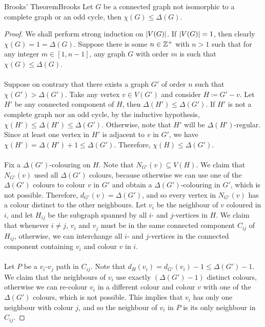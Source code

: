 \documentclass[math]{amznotes}
\theoremstyle{remark}
\newcommand{\0}{\mathbf{0}}
\newcommand{\1}{\mathbf{1}}
\begin{document}
\begin{thmbox}{Brooks' Theorem}{Brooks}
    Let $G$ be a connected graph not isomorphic to a complete graph or an odd cycle, then $\chi(G) \leq \Delta(G)$.
    \tcblower
    \begin{proof}
        We shall perform strong induction on ${\left\lvert {V(G)} \right\rvert}$. If ${\left\lvert {V(G)} \right\rvert} = 1$, then clearly $\chi(G) = 1 = \Delta(G)$. Suppose there is some $n \in \mathbb{Z}^+$ with $n > 1$ such that for any integer $m \in [1, n - 1]$, any graph $G$ with order $m$ is such that $\chi(G) \leq \Delta(G)$.
        \\\\
        Suppose on contrary that there exists a graph $G'$ of order $n$ such that $\chi(G') > \Delta(G')$. Take any vertex $v \in V(G')$ and consider $H \coloneqq G' - v$. Let $H'$ be any connected component of $H$, then $\Delta(H') \leq \Delta(G')$. If $H'$ is not a complete graph nor an odd cycle, by the inductive hypothesis, $\chi(H') \leq \Delta(H') \leq \Delta(G')$. Otherwise, note that $H'$ will be $\Delta(H')$-regular. Since at least one vertex in $H'$ is adjacent to $v$ in $G'$, we have $\chi(H') = \Delta(H') + 1 \leq \Delta(G')$. Therefore, $\chi(H) \leq \Delta(G')$.
        \\\\
        Fix a $\Delta(G')$-colouring on $H$. Note that $N_{G'}(v) \subseteq V(H)$. We claim that $N_{G'}(v)$ used all $\Delta(G')$ colours, because otherwise we can use one of the $\Delta(G')$ colours to colour $v$ in $G'$ and obtain a $\Delta(G')$-colouring in $G'$, which is not possible. Therefore, $d_{G'}(v) = \Delta(G')$, and so every vertex in $N_{G'}(v)$ has a colour distinct to the other neighbours. Let $v_i$ be the neighbour of $v$ coloured in $i$, and let $H_{ij}$ be the subgraph spanned by all $i$- and $j$-vertices in $H$. We claim that whenever $i \neq j$, $v_i$ and $v_j$ must be in the same connected component $C_{ij}$ of $H_{ij}$, otherwise, we can interchange all $i$- and $j$-vertices in the connected component containing $v_i$ and colour $v$ in $i$.
        \\\\
        Let $P$ be a $v_i$-$v_j$ path in $C_{ij}$. Note that $d_H(v_i) = d_{G'}(v_i) - 1 \leq \Delta(G') - 1$. We claim that the neighbours of $v_i$ use exactly $(\Delta(G') - 1)$ distinct colours, otherwise we can re-colour $v_i$ in a different colour and colour $v$ with one of the $\Delta(G')$ colours, which is not possible. This implies that $v_i$ has only one neighbour with colour $j$, and so the neighbour of $v_i$ in $P$ is its only neighbour in $C_{ij}$. 

\end{proof}
\end{thmbox}
\end{document}
